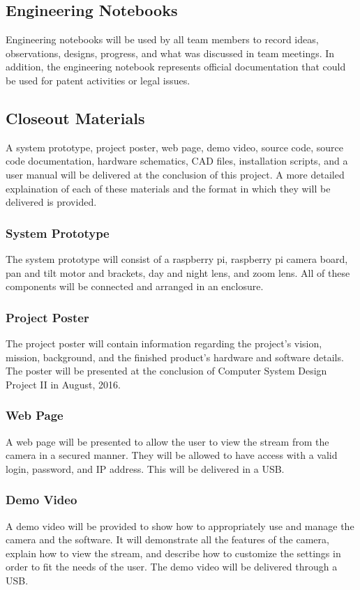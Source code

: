 \subsection{Engineering Notebooks}
Engineering notebooks will be used by all team members to record ideas, observations, designs, progress, and what was discussed in team meetings. In addition, the engineering notebook represents official documentation that could be used for patent activities or legal issues. 

\subsection{Closeout Materials}
A system prototype, project poster, web page, demo video, source code, source code documentation, hardware schematics, CAD files, installation scripts, and a user manual will be delivered at the conclusion of this project. A more detailed 
explaination of each of these materials and the format in which they will be delivered is provided.

\subsubsection{System Prototype}
The system prototype will consist of a raspberry pi, raspberry pi camera board, pan and tilt motor and brackets, day and night lens, and zoom lens. All of these components will be connected and arranged in an enclosure. 

\subsubsection{Project Poster}
The project poster will contain information regarding the project’s vision, mission, background, and the finished product’s hardware and software details. The poster will be presented at the conclusion of Computer System Design Project II in August, 2016. 

\subsubsection{Web Page}
A web page will be presented to allow the user to view the stream from the camera in a secured manner. They will be allowed to have access with a valid login, password, and IP address. This will be delivered in a USB. 

\subsubsection{Demo Video}
A demo video will be provided to show how to appropriately use and manage the camera and the software. It will demonstrate all the features of the camera, explain how to view the stream, and describe how to customize the settings in order to fit the needs of the user. The demo video will be delivered through a USB. 

